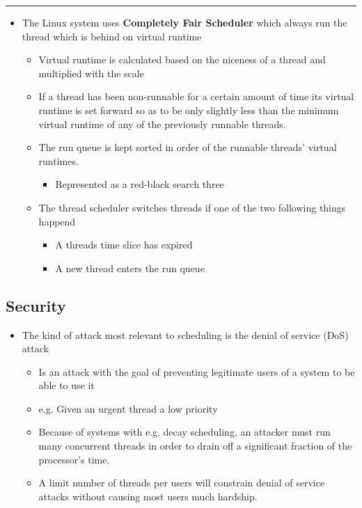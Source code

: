 \documentclass[11pt]{article}
\providecommand{\tightlist}{%
      \setlength{\itemsep}{0pt}\setlength{\parskip}{0pt}}
\begin{document}
\begin{center}\rule{0.5\linewidth}{\linethickness}\end{center}

\begin{itemize}
\tightlist
\item
  The Linux system uses \textbf{Completely Fair Scheduler} which always
  run the thread which is behind on virtual runtime

  \begin{itemize}
  \tightlist
  \item
    Virtual runtime is calculated based on the niceness of a thread and
    multiplied with the scale
  \item
    If a thread has been non-runnable for a certain amount of time its
    virtual runtime is set forward so as to be only slightly less than
    the minimum virtual runtime of any of the previously runnable
    threads.
  \item
    The run queue is kept sorted in order of the runnable threads'
    virtual runtimes.

    \begin{itemize}
    \tightlist
    \item
      Represented as a red-black search three
    \end{itemize}
  \item
    The thread scheduler switches threads if one of the two following
    things happend

    \begin{itemize}
    \tightlist
    \item
      A threads time slice has expired
    \item
      A new thread enters the run queue
    \end{itemize}
  \end{itemize}
\end{itemize}

    \subsection{Security}\label{security}

\begin{itemize}
\tightlist
\item
  The kind of attack most relevant to scheduling is the denial of
  service (DoS) attack

  \begin{itemize}
  \tightlist
  \item
    Is an attack with the goal of preventing legitimate users of a
    system to be able to use it
  \item
    e.g. Given an urgent thread a low priority
  \item
    Because of systems with e.g. decay scheduling, an attacker must run
    many concurrent threads in order to drain off a significant fraction
    of the processor's time.
  \item
    A limit number of threads per users will constrain denial of service
    attacks without causing most users much hardship.
  \end{itemize}
\end{itemize}
\end{document}
